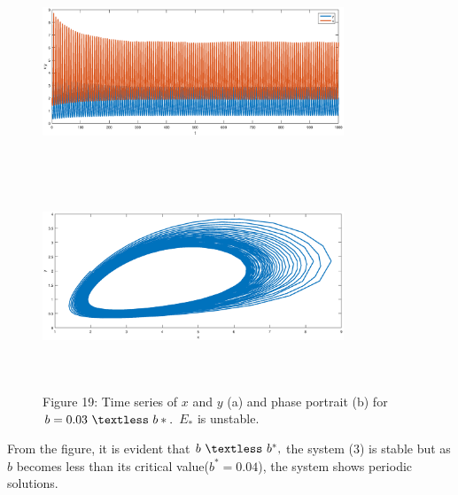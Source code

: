 \documentclass[a4paper, 10pt]{article}
\begin{document}
\begin{figure}[H]
	{\includegraphics[width=9cm, height=6cm]{25a.eps}}
	\endminipage\hfill
	{\includegraphics[width=9cm, height=6cm]{25b.eps}}
	\endminipage\hfill
	\begin{center} Figure 19: Time series of $x$ and $y$ (a) and phase portrait (b) for $b=0.03~\textless~b*.$ $E_*$ is unstable.  \end{center}
\end{figure}
From the figure, it is evident that $b~\textless~b^*,$ the system (3) is stable but as $b$ becomes less than its critical value($b^*=0.04$), the system shows periodic solutions.
\end{document}
